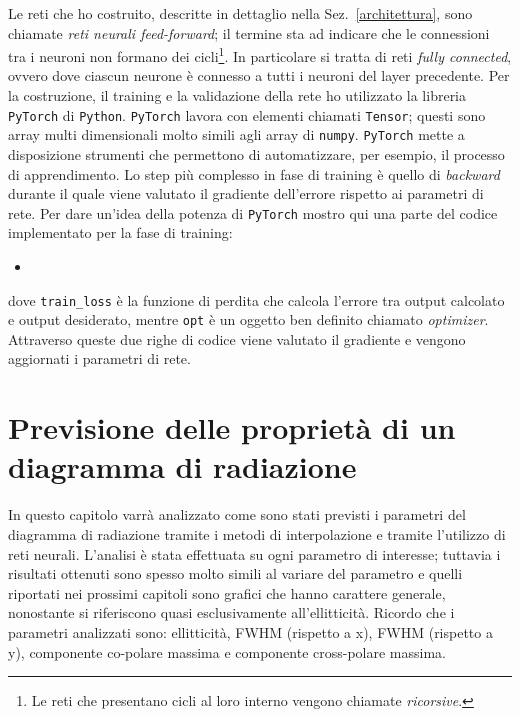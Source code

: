 \documentclass[12pt,a4paper,final]{book}
\newcommand{\insertcode}[2]{\begin{itemize}\item[]\end{itemize}} %
\begin{document}
Le reti che ho costruito, descritte in dettaglio nella Sez.~\ref{architettura}, sono chiamate \textit{reti neurali feed-forward}; il termine sta ad indicare che le connessioni tra i neuroni non formano dei cicli\footnote{Le reti che presentano cicli al loro interno vengono chiamate \textit{ricorsive}.}. In particolare si tratta di reti \textit{fully connected}, ovvero dove ciascun neurone è connesso a tutti i neuroni del layer precedente.
Per la costruzione, il training e la validazione della rete ho utilizzato la libreria \texttt{PyTorch} di \texttt{Python}. 
\texttt{PyTorch} lavora con elementi chiamati \texttt{Tensor}; questi sono array multi dimensionali molto simili agli array di \texttt{numpy}. \texttt{PyTorch} mette a disposizione strumenti che permettono di automatizzare, per esempio, il processo di apprendimento. Lo step più complesso in fase di training è quello di \textit{backward} durante il quale viene valutato il gradiente dell'errore rispetto ai parametri di rete. Per dare un'idea della potenza di \texttt{PyTorch} mostro qui una parte del codice implementato per la fase di training:
\insertcode{../scripts/opt.py}{}\label{opt}
dove \texttt{train\_loss} \`e la funzione di perdita che calcola l'errore tra output calcolato e output desiderato, mentre \texttt{opt} \`e un oggetto ben definito chiamato \textit{optimizer}.
Attraverso queste due righe di codice viene valutato il gradiente e vengono aggiornati i parametri di rete.





\chapter{Previsione delle proprietà di un diagramma di radiazione}\label{prev_param}
In questo capitolo varrà analizzato come sono stati previsti i parametri del diagramma di radiazione tramite i metodi di interpolazione e tramite l'utilizzo di reti neurali. 
L'analisi è stata effettuata su ogni parametro di interesse; tuttavia i risultati ottenuti sono spesso molto simili al variare del parametro e quelli riportati nei prossimi capitoli sono grafici che hanno carattere generale, nonostante si riferiscono quasi esclusivamente all'ellitticità. Ricordo che i parametri analizzati sono: ellitticità, FWHM (rispetto a x), FWHM (rispetto a y), componente co-polare massima e componente cross-polare massima.
\end{document}
